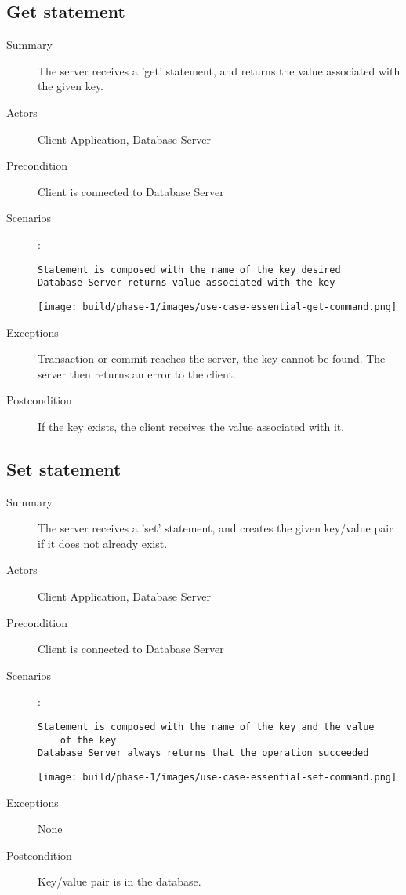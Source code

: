 \documentclass[a4paper]{report}
\begin{document}
	\pagebreak
	
	\subsection{Get statement}

	\begin{description}
		\item[Summary] The server receives a 'get' statement, and returns the value associated with the given key.
		\item[Actors] Client Application, Database Server
		\item[Precondition] Client is connected to Database Server
		\item[Scenarios] :

		\begin{lstlisting}
Statement is composed with the name of the key desired
Database Server returns value associated with the key
		\end{lstlisting}

		\begin{center}
			\texttt{[image: build/phase-1/images/use-case-essential-get-command.png]}
		\end{center}

		\item[Exceptions] Transaction or commit reaches the server, the key cannot be found. The server then returns an error to the client.

		\item[Postcondition] If the key exists, the client receives the value associated with it.
	\end{description}

	\pagebreak
	
	\subsection{Set statement}

	\begin{description}
		\item[Summary] The server receives a 'set' statement, and creates the given key/value pair if it does not already exist.
		\item[Actors] Client Application, Database Server
		\item[Precondition] Client is connected to Database Server
		\item[Scenarios] :

		\begin{lstlisting}
Statement is composed with the name of the key and the value
	of the key
Database Server always returns that the operation succeeded
		\end{lstlisting}

		\begin{center}
			\texttt{[image: build/phase-1/images/use-case-essential-set-command.png]}
		\end{center}

		\item[Exceptions] None
		\item[Postcondition] Key/value pair is in the database.
	\end{description}
	
\end{document}
